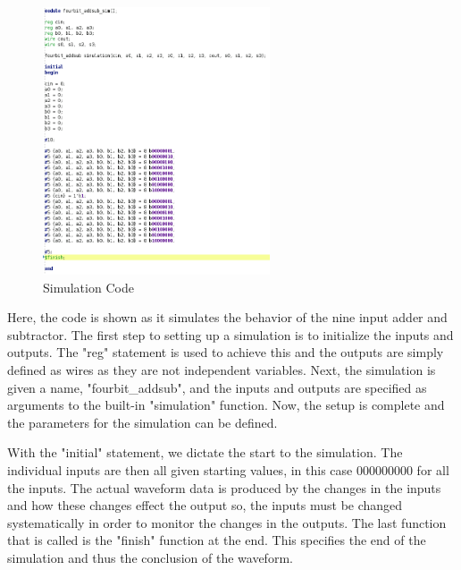 \documentclass[12pt]{article}
\begin{document}
    \begin{figure}[h]
        \centering
        \includegraphics[width=0.6\textwidth]{Simulation Code.png}
        \caption{Simulation Code}
        \label{fig:Simulation-Code}
    \end{figure}
    \par Here, the code is shown as it simulates the behavior of the nine input
    adder and subtractor. The first step to setting up a simulation is to
    initialize the inputs and outputs. The "reg" statement is used to achieve
    this and the outputs are simply defined as wires as they are not independent
    variables. Next, the simulation is given a name, "fourbit\_addsub", and the
    inputs and outputs are specified as arguments to the built-in "simulation"
    function. Now, the setup is complete and the parameters for the simulation
    can be defined.
    \par With the "initial" statement, we dictate the start to the simulation.
    The individual inputs are then all given starting values, in this case
    000000000 for all the inputs. The actual waveform data is produced by the
    changes in the inputs and how these changes effect the output so, the inputs
    must be changed systematically in order to monitor the changes in the
    outputs. The last function that is called is the "finish" function at the
    end. This specifies the end of the simulation and thus the conclusion of the
    waveform.
\end{document}
